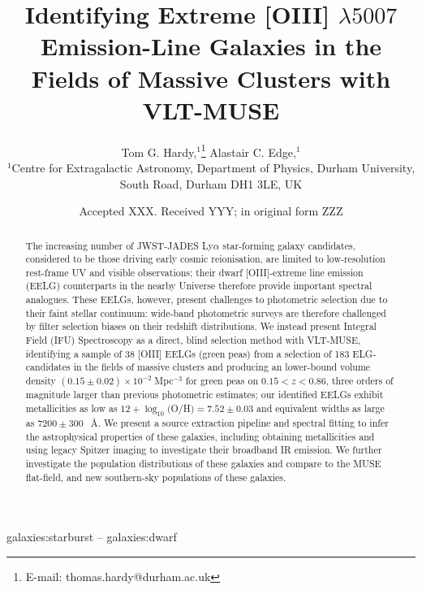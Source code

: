 \documentclass[fleqn,usenatbib]{mnras}
\title[Finding EELGS with VLT-MUSE]{Identifying Extreme [OIII] $\lambda5007$ Emission-Line Galaxies in the Fields of Massive Clusters with VLT-MUSE }
\author[T. G. Hardy et. al.]{
Tom G. Hardy,$^{1}$\thanks{E-mail: thomas.hardy@durham.ac.uk}
Alastair C. Edge,$^{1}$
\\
$^{1}$Centre for Extragalactic Astronomy, Department of Physics, Durham University, South Road, Durham DH1 3LE, UK\\
}
\date{Accepted XXX. Received YYY; in original form ZZZ}
\begin{document}
\label{firstpage}
\pagerange{\pageref{firstpage}--\pageref{lastpage}}
\maketitle

\begin{abstract}
The increasing number of JWST-JADES Ly$\alpha$ star-forming galaxy candidates, considered to be those driving early cosmic reionisation, are limited to low-resolution rest-frame UV and visible observations; their dwarf [OIII]-extreme line emission (EELG) counterparts in the nearby Universe therefore provide important spectral analogues. These EELGs, however, present challenges to photometric selection due to their faint stellar continuum: wide-band photometric surveys are therefore challenged by filter selection biases on their redshift distributions. We instead present Integral Field (IFU) Spectroscopy as a direct, blind selection method with VLT-MUSE, identifying a sample of 38 [OIII] EELGs (green peas) from a selection of 183 ELG-candidates in the fields of massive clusters and producing an lower-bound volume density $(0.15 \pm 0.02) \times 10^{-2}\;$Mpc$^{-3}$ for green peas on $0.15<z<0.86$, three orders of magnitude larger than previous photometric estimates; our identified EELGs exhibit metallicities as low as $12+\log_{10}($O/H$)=7.52\pm0.03$ and equivalent widths as large as $7200\pm300\;$~\AA. We present a source extraction pipeline and spectral fitting to infer the astrophysical properties of these galaxies, including obtaining metallicities and using legacy Spitzer imaging to investigate their broadband IR emission. We further investigate the population distributions of these galaxies and compare to the MUSE flat-field, and new southern-sky populations of these galaxies.
\end{abstract}

\begin{keywords}
galaxies:starburst -- galaxies:dwarf 
\end{keywords}


\end{document}
